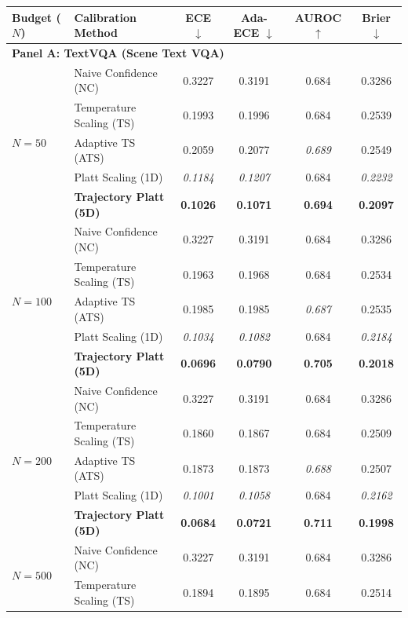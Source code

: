 \begin{table}[t]
\setlength{\tabcolsep}{3pt}
\renewcommand{\arraystretch}{0.88}
\centering
\scriptsize
\begin{tabular}{llcccc}
\toprule
\textbf{Budget ($N$)} & \textbf{Calibration Method} & \textbf{ECE} $\downarrow$ & \textbf{Ada-ECE} $\downarrow$ & \textbf{AUROC} $\uparrow$ & \textbf{Brier} $\downarrow$ \\
\midrule
\multicolumn{6}{l}{\textbf{Panel A: TextVQA (Scene Text VQA)}} \\
\midrule
\multirow{5}{*}{$N = 50$} & Naive Confidence (NC) & 0.3227 & 0.3191 & 0.684 & 0.3286 \\
 & Temperature Scaling (TS) & 0.1993 & 0.1996 & 0.684 & 0.2539 \\
 & Adaptive TS (ATS) & 0.2059 & 0.2077 & \textit{0.689} & 0.2549 \\
 & Platt Scaling (1D) & \textit{0.1184} & \textit{0.1207} & 0.684 & \textit{0.2232} \\
 & \textbf{Trajectory Platt (5D)} & \textbf{0.1026} & \textbf{0.1071} & \textbf{0.694} & \textbf{0.2097} \\
\midrule
\multirow{5}{*}{$N = 100$} & Naive Confidence (NC) & 0.3227 & 0.3191 & 0.684 & 0.3286 \\
 & Temperature Scaling (TS) & 0.1963 & 0.1968 & 0.684 & 0.2534 \\
 & Adaptive TS (ATS) & 0.1985 & 0.1985 & \textit{0.687} & 0.2535 \\
 & Platt Scaling (1D) & \textit{0.1034} & \textit{0.1082} & 0.684 & \textit{0.2184} \\
 & \textbf{Trajectory Platt (5D)} & \textbf{0.0696} & \textbf{0.0790} & \textbf{0.705} & \textbf{0.2018} \\
\midrule
\multirow{5}{*}{$N = 200$} & Naive Confidence (NC) & 0.3227 & 0.3191 & 0.684 & 0.3286 \\
 & Temperature Scaling (TS) & 0.1860 & 0.1867 & 0.684 & 0.2509 \\
 & Adaptive TS (ATS) & 0.1873 & 0.1873 & \textit{0.688} & 0.2507 \\
 & Platt Scaling (1D) & \textit{0.1001} & \textit{0.1058} & 0.684 & \textit{0.2162} \\
 & \textbf{Trajectory Platt (5D)} & \textbf{0.0684} & \textbf{0.0721} & \textbf{0.711} & \textbf{0.1998} \\
\midrule
\multirow{5}{*}{$N = 500$} & Naive Confidence (NC) & 0.3227 & 0.3191 & 0.684 & 0.3286 \\
 & Temperature Scaling (TS) & 0.1894 & 0.1895 & 0.684 & 0.2514 \\

\end{tabular}
\end{table}
